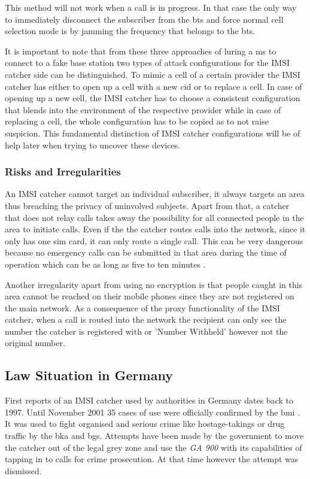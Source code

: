 This method will not work when a call is in progress.
In that case the only way to immediately disconnect the subscriber from the \gls{bts} and force normal cell selection mode is by jamming the frequency that belongs to the \gls{bts}.

It is important to note that from these three approaches of luring a \gls{ms} to connect to a fake base station two types of attack configurations for the IMSI catcher side can be distinguished.
To mimic a cell of a certain provider the IMSI catcher has either to open up a cell with a new \gls{cid} or to replace a cell.
In case of opening up a new cell, the IMSI catcher has to choose a consistent configuration that blends into the environment of the respective provider while in case of replacing a cell, the whole configuration has to be copied as to not raise suspicion.
This fundamental distinction of IMSI catcher configurations will be of help later when trying to uncover these devices.

\subsubsection{Risks and Irregularities}
An IMSI catcher cannot target an individual subscriber, it always targets an area thus breaching the privacy of uninvolved subjects.
Apart from that, a catcher that does not relay calls takes away the possibility for all connected people in the area to initiate calls.
Even if the the catcher routes calls into the network, since it only has one \gls{sim} card, it can only route a single call.
This can be very dangerous because no emergency calls can be submitted in that area during the time of operation which can be as long as five to ten minutes \cite{fox}.

Another irregularity apart from using no encryption is that people caught in this area cannot be reached on their mobile phones since they are not registered on the main network.
As a consequence of the proxy functionality of the IMSI catcher, when a call is routed into the network the recipient can only see the number the catcher is registered with or 'Number Withheld' however not the original number.

\subsection{Law Situation in Germany}
\label{sec:catcher_law}

First reports of an IMSI catcher used by authorities in Germany dates back to 1997.
Until November 2001 35 cases of use were officially confirmed by the \gls{bmi} \cite{fox}.
It was used to fight organised and serious crime like hostage-takings or drug traffic by the \gls{bka} and \gls{bgs}.
Attempts have been made by the government to move the catcher out of the legal grey zone and use the \emph{GA 900} with its capabilities of tapping in to calls for crime prosecution.
At that time however the attempt was dismissed.

